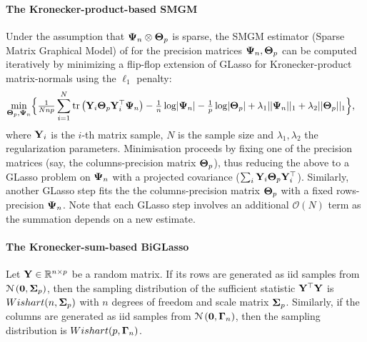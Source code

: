     \paragraph{The Kronecker-product-based SMGM}
    Under the assumption that $\mathbf{\Psi}_n \otimes \mathbf{\Theta}_p$ is sparse, the SMGM estimator (Sparse Matrix Graphical Model) of \citet{Leng:Sparse12} for the precision matrices $\mathbf{\Psi}_n, \mathbf{\Theta}_p$ can be computed iteratively by minimizing a flip-flop extension of GLasso for Kronecker-product matrix-normals using the $\ell_1$ penalty:
    \begin{equation}\label{equ:chap6_SMGM_problem}
      \begin{split}
      &\underset{\mathbf{\Theta}_p, \mathbf{\Psi}_n}{\textrm{min}} \Big\{
      \tfrac{1}{Nnp} \sum_{i=1}^{N} \textrm{tr} \left( \mathbf{Y}_i \mathbf{\Theta}_p \mathbf{Y}^\top_i \mathbf{\Psi}_n \right) -
      \tfrac{1}{n} \log \lvert \mathbf{\Psi}_n \rvert - \tfrac{1}{p} \log \lvert \mathbf{\Theta}_p \rvert + \lambda_1 || \mathbf{\Psi}_n ||_1  + \lambda_2 || \mathbf{\Theta}_p ||_1 \Big\},
      \end{split}
    \end{equation}
    where $\mathbf{Y}_i$ is the $i$-th matrix sample, $N$ is the sample size and $\lambda_1, \lambda_2$ the regularization parameters.
    Minimisation proceeds by fixing one of the precision matrices (say, the columns-precision matrix $\mathbf{\Theta}_p$), thus reducing the above to a GLasso problem on $\mathbf{\Psi}_n$ with a projected covariance ($\sum_{i} \mathbf{Y}_i \mathbf{\Theta}_p \mathbf{Y}^\top_i$).
    Similarly, another GLasso step fits the the columns-precision matrix $\mathbf{\Theta}_p$ with a fixed rows-precision $\mathbf{\Psi}_n$.
    Note that each GLasso step involves an additional $\mathcal{O}(N)$ term as the summation depends on a new estimate.

    \paragraph{The Kronecker-sum-based BiGLasso}
    Let $\mathbf{Y} \in \mathbb{R}^{n \times p}$  be a random matrix.
    If its rows are generated as iid samples from $\mathcal{N} \left( \mathbf{0},  \mathbf{\Sigma}_p \right)$, then the sampling distribution of the sufficient statistic $\mathbf{Y}^{\top}\mathbf{Y}$ is $Wishart (n, \mathbf{\Sigma}_p)$ with $n$ degrees of freedom and scale matrix $\mathbf{\Sigma}_p$.
    Similarly, if the columns are generated as iid samples from $\mathcal{N} \left( \mathbf{0},  \mathbf{\Gamma}_n \right)$, then the sampling distribution is $Wishart(p, \mathbf{\Gamma}_n)$.
    
